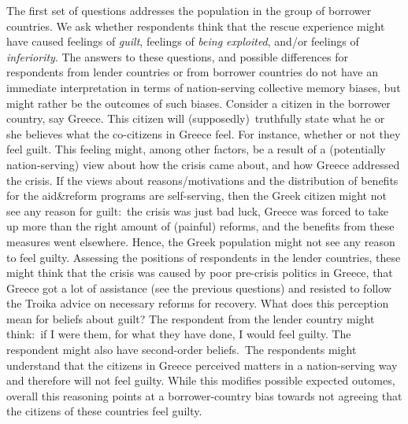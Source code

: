 The first set of questions addresses the population in the group of borrower
countries. We ask whether respondents think that the rescue experience might
have caused feelings of \textit{guilt}, feelings of \textit{being
exploited}, and/or feelings of \textit{inferiority}. The answers to these
questions, and possible differences for respondents from lender countries or
from borrower countries do not have an immediate interpretation in terms of
nation-serving collective memory biases, but might rather be the outcomes of
such biases. Consider a citizen in the borrower country, say Greece. This
citizen will (supposedly)\ truthfully state what he or she believes what the
co-citizens in Greece feel. For instance, whether or not they feel guilt.
This feeling might, among other factors, be a result of a (potentially
nation-serving) view about how the crisis came about, and how Greece
addressed the crisis. If the views about reasons/motivations and the
distribution of benefits for the aid\&reform programs are self-serving, then
the Greek citizen might not see any reason for guilt:\ the crisis was just
bad luck, Greece was forced to take up more than the right amount of
(painful) reforms, and the benefits from these measures went elsewhere.
Hence, the Greek population might not see any reason to feel guilty.
Assessing the positions of respondents in the lender countries, these might
think that the crisis was caused by poor pre-crisis politics in Greece, that
Greece got a lot of assistance (see the previous questions) and resisted to
follow the Troika advice on necessary reforms for recovery. What does this
perception mean for beliefs about guilt? The respondent from the lender
country might think:\ if I were them, for what they have done, I would feel
guilty. The respondent might also have second-order beliefs.\ The respondents
might understand that the citizens in Greece perceived matters in a
nation-serving way and therefore will not feel guilty. While this modifies
possible expected outomes, overall this reasoning points at a
borrower-country bias towards not agreeing that the citizens of these
countries feel guilty. 



